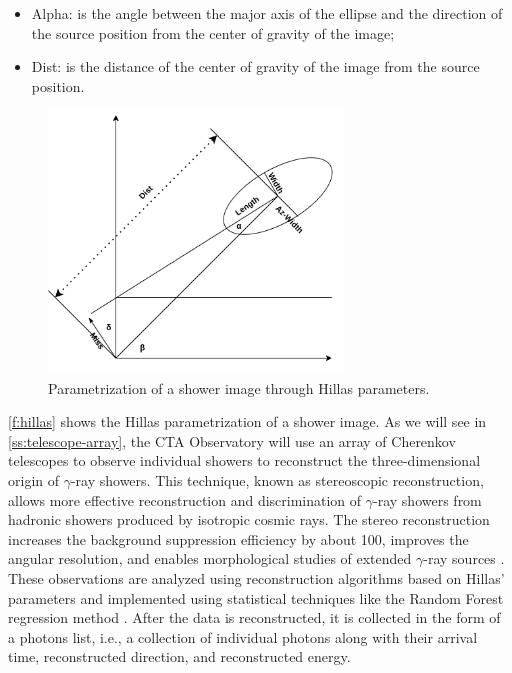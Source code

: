 \begin{itemize}
    \item Alpha: is the angle between the major axis of the ellipse and the direction of the source position from the center of gravity of the image;
    \item Dist: is the distance of the center of gravity of the image from the source position.
\end{itemize}
\begin{figure}[ht] 
\centering
\includegraphics[width=0.7\textwidth]{figures/introduction/hillas.png}
\caption{Parametrization of a shower image through Hillas parameters.}
\label{f:hillas}
\end{figure}
\autoref{f:hillas} shows the Hillas parametrization of a shower image.
As we will see in \autoref{ss:telescope-array}, the CTA Observatory will use an array of Cherenkov telescopes to observe individual showers to reconstruct the three-dimensional origin of $\gamma$-ray showers. This technique, known as stereoscopic reconstruction, allows more effective reconstruction and discrimination of $\gamma$-ray showers from hadronic showers produced by isotropic cosmic rays. The stereo reconstruction increases the background suppression efficiency by about 100, improves the angular resolution, and enables morphological studies of extended $\gamma$-ray sources \cite{Spurio2018}.
These observations are analyzed using reconstruction algorithms based on Hillas’ parameters and implemented using statistical techniques like the Random Forest regression method \cite{Albert2008}. After the data is reconstructed, it is collected in the form of a photons list, i.e., a collection of individual photons along with their arrival time, reconstructed direction, and reconstructed energy. 

